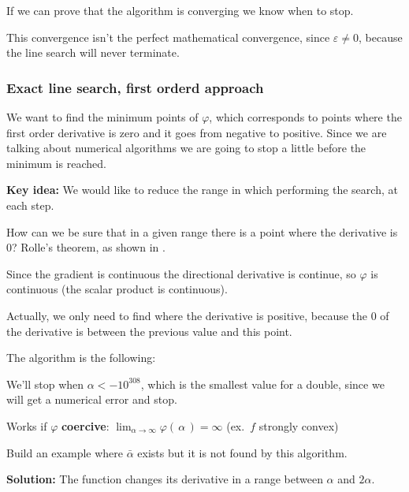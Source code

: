 \documentclass[computationalMathematics.tex]{subfiles}
\begin{document}
If we can prove that the algorithm is converging we know when to stop.

This convergence isn't the perfect mathematical convergence, since $\varepsilon \ne 0$, because the line search will never terminate.


\subsubsection{Exact line search, first orderd approach}
We want to find the minimum points of $\varphi$, which corresponds to points where the first order derivative is zero and it goes from negative to positive. Since we are talking about numerical algorithms we are going to stop a little before the minimum is reached.

\textbf{Key idea:} We would like to reduce the range in which performing the search, at each step.

How can we be sure that in a given range there is a point where the derivative is $0$? Rolle's theorem, as shown in .


Since the gradient is continuous the directional derivative is continue, so $\varphi$ is continuous (the scalar product is continuous).

Actually, we only need to find where the derivative is positive, because the $0$ of the derivative is between the previous value and this point.

The algorithm is the following:


We'll stop when $\alpha < -{10}^{308}$, which is the smallest value for a double, since we will get a numerical error and stop.

Works if $\varphi$ \textbf{coercive}:
       $\lim_{\alpha \to \infty} \varphi( \, \alpha \, ) = \infty$
       (ex.~$f$ strongly convex)

\begin{exe}
Build an example where $\bar{\alpha}$ exists but it is not found by this algorithm.
\end{exe}
\textbf{Solution:} The function changes its derivative in a range between $\alpha$ and $2 \alpha$.
\end{document}
